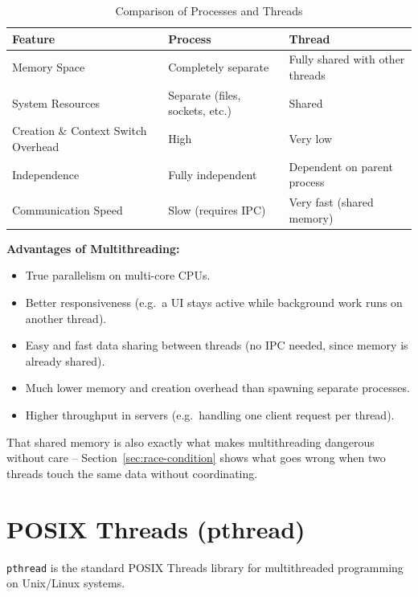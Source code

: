 \begin{table}[h!]
\centering
\small
\renewcommand{\arraystretch}{1.3}
\begin{tabular}{|>{\raggedright\arraybackslash}p{4cm}|>{\raggedright\arraybackslash}p{5cm}|>{\raggedright\arraybackslash}p{5cm}|}
\hline
\textbf{Feature} & \textbf{Process} & \textbf{Thread} \\ \hline
Memory Space & Completely separate & Fully shared with other threads \\ \hline
System Resources & Separate (files, sockets, etc.) & Shared \\ \hline
Creation \& Context Switch Overhead & High & Very low \\ \hline
Independence & Fully independent & Dependent on parent process \\ \hline
Communication Speed & Slow (requires IPC) & Very fast (shared memory) \\ \hline
\end{tabular}
\caption{Comparison of Processes and Threads}
\label{tab:process-vs-thread}
\end{table} %

\textbf{Advantages of Multithreading:} %
\begin{itemize}
    \item True parallelism on multi-core CPUs. %
    \item Better responsiveness (e.g.\ a UI stays active while background work runs on another thread). %
    \item Easy and fast data sharing between threads (no IPC needed, since memory is already shared). %
    \item Much lower memory and creation overhead than spawning separate processes. %
    \item Higher throughput in servers (e.g.\ handling one client request per thread). %
\end{itemize}
That shared memory is also exactly what makes multithreading dangerous without care -- Section~\ref{sec:race-condition} shows what goes wrong when two threads touch the same data without coordinating. %

\section{POSIX Threads (pthread)} %
\texttt{pthread} is the standard POSIX Threads library for multithreaded programming on Unix/Linux systems. %

